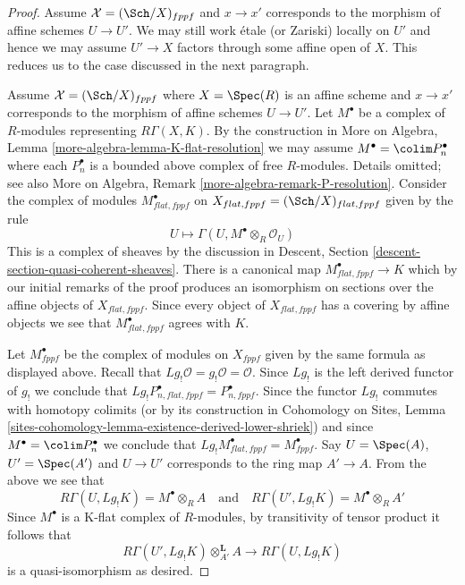 \begin{proof}
\medskip\noindent
Assume $\mathcal{X} = (\Sch/X)_{fppf}$ and $x \to x'$ corresponds
to the morphism of affine schemes $U \to U'$. We may still work
\'etale (or Zariski) locally on $U'$ and hence we may assume
$U' \to X$ factors through some affine open of $X$.
This reduces us to the case discussed in the next paragraph.

\medskip\noindent
Assume $\mathcal{X} = (\Sch/X)_{fppf}$ where $X = \Spec(R)$
is an affine scheme and $x \to x'$ corresponds to the morphism
of affine schemes $U \to U'$. Let $M^\bullet$ be a complex
of $R$-modules representing $R\Gamma(X, K)$. By the construction in
More on Algebra, Lemma \ref{more-algebra-lemma-K-flat-resolution}
we may assume $M^\bullet = \colim P_n^\bullet$ where each $P_n^\bullet$
is a bounded above complex of free $R$-modules. Details omitted; see also
More on Algebra, Remark \ref{more-algebra-remark-P-resolution}.
Consider the complex of modules $M^\bullet_{flat, fppf}$ on
$X_{flat, fppf} = (\Sch/X)_{flat, fppf}$ given by the rule
$$
U \longmapsto \Gamma(U, M^\bullet \otimes_R \mathcal{O}_U)
$$
This is a complex of sheaves by the discussion in
Descent, Section \ref{descent-section-quasi-coherent-sheaves}.
There is a canonical map $M^\bullet_{flat, fppf} \to K$ which
by our initial remarks of the proof produces an isomorphism
on sections over the affine objects of $X_{flat, fppf}$.
Since every object of $X_{flat, fppf}$ has a covering by
affine objects we see that $M^\bullet_{flat, fppf}$ agrees with $K$.

\medskip\noindent
Let $M^\bullet_{fppf}$ be the complex of modules on $X_{fppf}$
given by the same formula as displayed above.
Recall that $Lg_!\mathcal{O} = g_!\mathcal{O} = \mathcal{O}$.
Since $Lg_!$ is the left derived functor of $g_!$ we conclude
that $Lg_!P_{n, flat, fppf}^\bullet = P_{n, fppf}^\bullet$.
Since the functor $Lg_!$ commutes with homotopy colimits
(or by its construction in Cohomology on Sites,
Lemma \ref{sites-cohomology-lemma-existence-derived-lower-shriek})
and since $M^\bullet = \colim P_n^\bullet$
we conclude that $Lg_!M^\bullet_{flat, fppf} = M^\bullet_{fppf}$.
Say $U = \Spec(A)$, $U' = \Spec(A')$ and $U \to U'$ corresponds
to the ring map $A' \to A$. From the above we see that
$$
R\Gamma(U, Lg_!K) = M^\bullet \otimes_R A
\quad\text{and}\quad
R\Gamma(U', Lg_!K) = M^\bullet \otimes_R A'
$$
Since $M^\bullet$ is a K-flat complex of $R$-modules,
by transitivity of tensor product it follows that
$$
R\Gamma(U', Lg_!K) \otimes_{A'}^\mathbf{L} A
\longrightarrow
R\Gamma(U, Lg_!K)
$$
is a quasi-isomorphism as desired.
\end{proof}

